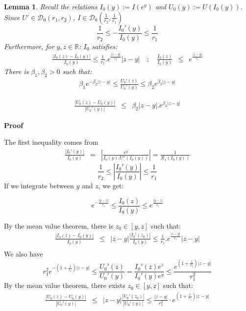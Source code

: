 \documentclass[11pt, psfig]{article}
\newtheorem{lemma}[theorem]{Lemma}
\theoremstyle{definition}
\theoremstyle{remark}
\numberwithin{equation}{section}
\def\sR{\mathbb{R}}
\def\sR{\mathbb{R}}
\newcommand{\be}{\begin{equation}}
\newcommand{\ee}{\end{equation}}
\def \proof{{\noindent \bf Proof}\quad}
\begin{document}
 
  \begin{lemma}\label{estimates_I0_U0}
  Recall the relations $I_0(y):=I(e^y)$ and $U_0(y):=U(I_0(y))$. Since $U'\in \mathcal{D}_{0}(r_1,r_2) $, $I\in \mathcal{D}_{0}\left(\frac{1}{r_2},\frac{1}{r_1}\right) $
\be
\frac{1}{r_2} \leq -\frac{I_0'(y)}{I_0(y)} \leq \frac{1}{r_1}
\ee
 Furthermore, for $y, z\in \sR$:
$I_0$ satisfies:
 \begin{eqnarray}
 \frac{ |I_0(z)-I_0(y)|}{I_0(y)} \leq    \frac{1}{r_1} .  e^{\frac{ |z-y|}{r_1}} |z-y|\quad ; \quad \frac{ I_0(z)}{I_0(y)} &\leq&  e^{\frac{|z-y|}{r_1}} 
\end{eqnarray}
There is $\beta_1, \beta_2>0$ such that:
 \begin{eqnarray}  
\beta_1 e^{-\beta_2 |z-y|} \leq \frac{U_0'(z)}{U_0'(y)}\leq \beta_2 e^{\beta_2 |z-y|}
\end{eqnarray}

 \begin{eqnarray}
 \frac{ |U_0(z)-U_0(y)|}{|U_0'(y)|} &\leq&\beta_2 |z-y| .  e^{\beta_2 |z-y|}
\end{eqnarray}

 \end{lemma}
 
 \proof
 
 The first inequality comes from
  \begin{eqnarray*}
  \frac{ |I_0'(y)|}{I_0(y)} &=& |\frac{e^y }{I_0(y). U''(I_0(y))}|=\frac{1}{\mathcal{R}_1(I_0(y))}
 \end{eqnarray*}
$$  \frac{1}{r_2} \leq |\frac{ I_0'(y)}{I_0(y)} | \leq \frac{ 1}{r_1} $$
If we integrate between $y$ and $z$, we get:

$$e^{-\frac{|y-z|}{r_1}} \leq \frac{I_0(z)}{I_0(y)}\leq e^{\frac{|y-z|}{r_1}}$$

 By the mean value theorem, there is $z_0 \in [y, z]$ such that:
 \begin{eqnarray*}
  \frac{ |I_0(z)-I_0(y)|}{I_0(y)} &\leq& |z-y|  \frac{ |I_0'(z_0)|}{I_0(y)} \leq   \frac{1}{r_1} .  e^{\frac{ |z-y|}{r_1}} |z-y| \\
\end{eqnarray*}
 We also have
\be
r_1^2 e^{-(1+\frac{1}{r_1})|z-y|} \leq \frac{U_0'(z)}{U_0'(y)}= \frac{I_0'(z)e^z}{I_0'(y)e^{y}}\leq \frac{e^{(1+\frac{1}{r_1})|z-y|}}{r_1^2}
\ee
By the mean value theorem, there exists $z_0\in [y,z]$ such that:
 \begin{eqnarray*}
 \frac{ |U_0(z)-U_0(y)|}{|U_0'(y)|} &\leq& |z-y|  \frac{ |U_0'(z_0)|}{|U_0'(y)|} \leq  \frac{ |z-y|}{r_1^2} \cdot e^{(1+\frac{1}{r_1}) |z-y|}
\end{eqnarray*}
\end{document}
